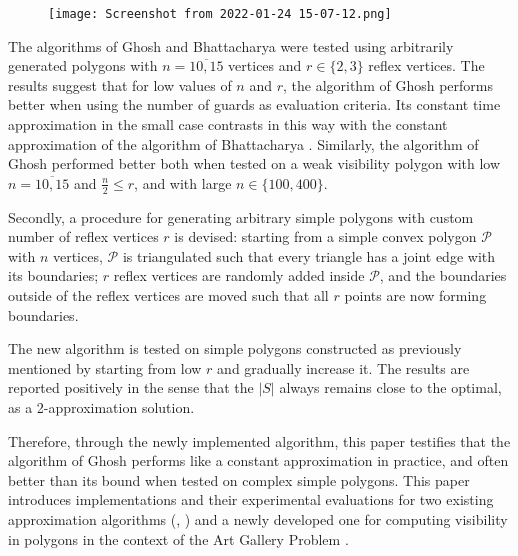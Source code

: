 \begin{figure}[h!]
    \centering
    \texttt{[image: Screenshot from 2022-01-24 15-07-12.png]}
    \caption{}
    \label{fig:weak}
\end{figure}

The algorithms of Ghosh \cite{GHOSH2010718} and Bhattacharya \cite{bhattacharya2016approximability} were tested using arbitrarily generated polygons with $n = \overline{10, 15}$ vertices and $r \in \{2, 3\}$ reflex vertices. The results suggest that for low values of $n$ and $r$, the algorithm of Ghosh \cite{GHOSH2010718} performs better when using the number of guards as evaluation criteria. Its constant time approximation in the small case contrasts in this way with the constant approximation of the algorithm of Bhattacharya \cite{bhattacharya2016approximability}. Similarly, the algorithm of Ghosh \cite{GHOSH2010718} performed better both when tested on a weak visibility polygon with low $n = \overline{10, 15}$ and $\frac n 2 \leq r$, and with large $n \in \{100, 400\}$.

Secondly, a procedure for generating arbitrary simple polygons with custom number of reflex vertices $r$ is devised: starting from a simple convex polygon $\mathcal P$ with $n$ vertices, $\mathcal P$ is triangulated such that every triangle has a joint edge with its boundaries; $r$ reflex vertices are randomly added inside $\mathcal P$, and the boundaries outside of the reflex vertices are moved such that all $r$ points are now forming boundaries.

The new algorithm is tested on simple polygons constructed as previously mentioned by starting from low $r$ and gradually increase it. The results are reported positively in the sense that the $|S|$ always remains close to the optimal, as a 2-approximation solution.

Therefore, through the newly implemented algorithm, this paper \cite{maleki2022implementation} testifies that the algorithm of Ghosh \cite{GHOSH2010718} performs like a constant approximation in practice, and often better than its bound when tested on complex simple polygons.
This paper \cite{maleki2022implementation} introduces implementations and their experimental evaluations for two existing approximation algorithms (\cite{GHOSH2010718}, \cite{bhattacharya2016approximability}) and a newly developed one for computing visibility in polygons in the context of the Art Gallery Problem \cite{o1987art}.

